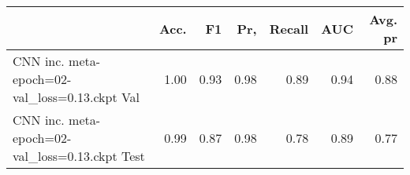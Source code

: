 \begin{tabular}{lrrrrrr}
\toprule
{} &  Acc. &    F1 &   Pr, &  Recall &   AUC &  Avg. pr \\
\midrule
CNN inc. meta-epoch=02-val\_loss=0.13.ckpt Val  &  1.00 &  0.93 &  0.98 &    0.89 &  0.94 &     0.88 \\
CNN inc. meta-epoch=02-val\_loss=0.13.ckpt Test &  0.99 &  0.87 &  0.98 &    0.78 &  0.89 &     0.77 \\
\bottomrule
\end{tabular}
